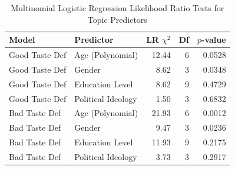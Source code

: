 \begin{table}[htpb]
\centering
\begin{tabular}{llrrr}
\toprule
Model & Predictor & LR $\chi^2$ & Df & $p$-value \\
\midrule
Good Taste Def & Age (Polynomial) & 12.44 & 6 & 0.0528 \\
Good Taste Def & Gender & 8.62 & 3 & 0.0348 \\
Good Taste Def & Education Level & 8.62 & 9 & 0.4729 \\
Good Taste Def & Political Ideology & 1.50 & 3 & 0.6832 \\
Bad Taste Def & Age (Polynomial) & 21.93 & 6 & 0.0012 \\
Bad Taste Def & Gender & 9.47 & 3 & 0.0236 \\
Bad Taste Def & Education Level & 11.93 & 9 & 0.2175 \\
Bad Taste Def & Political Ideology & 3.73 & 3 & 0.2917 \\
\bottomrule
\end{tabular}
\caption{Multinomial Logistic Regression Likelihood Ratio Tests for Topic Predictors}
\label{tab:wald_models}
\end{table}

